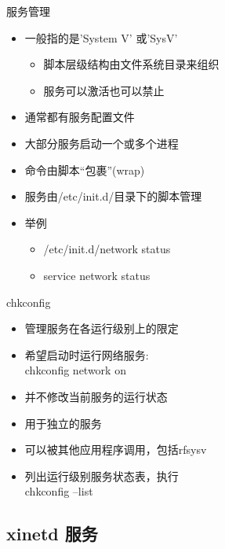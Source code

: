 \begin{frame}{服务管理}
\begin{itemize}
\item 一般指的是'System V' 或'SysV'

\begin{itemize}
\item 脚本层级结构由文件系统目录来组织
\item 服务可以激活也可以禁止
\end{itemize}
\item 通常都有服务配置文件
\item 大部分服务启动一个或多个进程
\item 命令由脚本“包裹”(wrap)
\item 服务由/etc/init.d/目录下的脚本管理
\item 举例

\begin{itemize}
\item /etc/init.d/network status
\item service network status
\end{itemize}
\end{itemize}

\end{frame} 
\begin{frame}{chkconfig}
\begin{itemize}
\item 管理服务在各运行级别上的限定
\item 希望启动时运行网络服务:\\
chkconfig network on
\item 并不修改当前服务的运行状态
\item 用于独立的服务
\item 可以被其他应用程序调用，包括rfsysv
\item 列出运行级别服务状态表，执行\\
chkconfig --list
\end{itemize}

\end{frame} 
\subsection{xinetd 服务}


